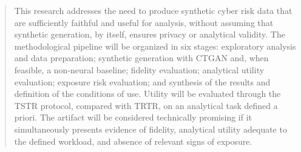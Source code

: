 
\begin{abstract}
This research addresses the need to produce synthetic cyber risk data that are
sufficiently faithful and useful for analysis, without assuming that synthetic
generation, by itself, ensures privacy or analytical validity. The
methodological pipeline will be organized in six stages: exploratory analysis
and data preparation; synthetic generation with CTGAN and, when feasible, a
non-neural baseline; fidelity evaluation; analytical utility evaluation;
exposure risk evaluation; and synthesis of the results and definition of the
conditions of use. Utility will be evaluated through the TSTR protocol, compared
with TRTR, on an analytical task defined a priori. The artifact will be
considered technically promising if it simultaneously presents evidence of
fidelity, analytical utility adequate to the defined workload, and absence of
relevant signs of exposure.
\end{abstract}
